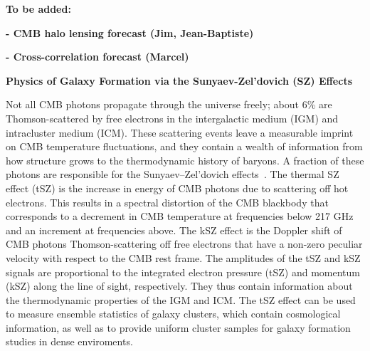 \documentclass[PICOReport.tex]{subfiles}
\begin{document}
\textbf{To be added:}

\textbf{- CMB halo lensing forecast (Jim, Jean-Baptiste)}

\textbf{- Cross-correlation forecast (Marcel)}


{\bf Physics of Galaxy Formation via the Sunyaev-Zel'dovich (SZ) Effects}

Not all CMB photons propagate through the universe freely; about 6\% are Thomson-scattered by free electrons in the intergalactic medium (IGM) and intracluster medium (ICM). These scattering events leave a measurable imprint on CMB temperature fluctuations, and they contain a wealth of information from how structure grows to the thermodynamic history of baryons. A fraction of these photons are responsible for the Sunyaev--Zel'dovich effects~\citep{SZ1969,SZ1972}. The thermal SZ effect (tSZ) is the increase in energy of CMB photons due to scattering off hot electrons. This results in a spectral distortion
 of the CMB blackbody that corresponds to a decrement in CMB temperature at frequencies below 217 GHz and an increment at frequencies above. The kSZ effect is the Doppler shift of CMB photons Thomson-scattering off free electrons that have a non-zero peculiar velocity with respect to the CMB rest frame. 
The amplitudes of the tSZ and kSZ signals are proportional to the integrated electron pressure (tSZ) and momentum (kSZ) along the line of sight, respectively.  They thus contain information about the thermodynamic properties of the IGM and ICM.
The tSZ effect can be used to measure ensemble statistics of galaxy clusters, which contain cosmological information, as well as to provide uniform cluster samples for galaxy formation studies in dense enviroments.
%
\end{document}
